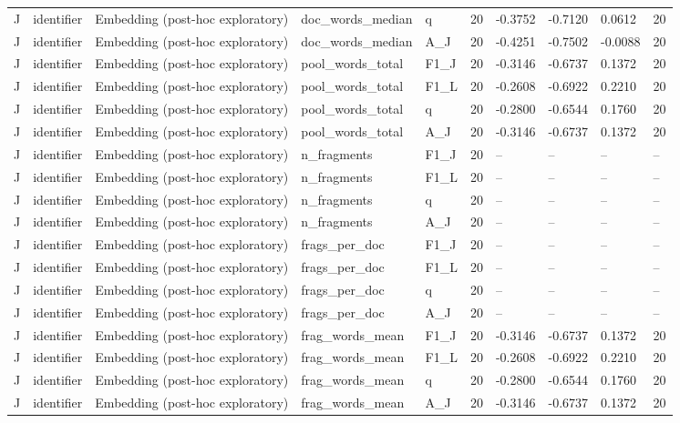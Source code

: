\begin{table}[t]
{\begin{tabular}{llllllllll}
J & identifier & Embedding (post-hoc exploratory) & doc\_words\_median & q & 20 & -0.3752 & -0.7120 & 0.0612 & 20 \\
J & identifier & Embedding (post-hoc exploratory) & doc\_words\_median & A\_J & 20 & -0.4251 & -0.7502 & -0.0088 & 20 \\
J & identifier & Embedding (post-hoc exploratory) & pool\_words\_total & F1\_J & 20 & -0.3146 & -0.6737 & 0.1372 & 20 \\
J & identifier & Embedding (post-hoc exploratory) & pool\_words\_total & F1\_L & 20 & -0.2608 & -0.6922 & 0.2210 & 20 \\
J & identifier & Embedding (post-hoc exploratory) & pool\_words\_total & q & 20 & -0.2800 & -0.6544 & 0.1760 & 20 \\
J & identifier & Embedding (post-hoc exploratory) & pool\_words\_total & A\_J & 20 & -0.3146 & -0.6737 & 0.1372 & 20 \\
J & identifier & Embedding (post-hoc exploratory) & n\_fragments & F1\_J & 20 & -- & -- & -- & -- \\
J & identifier & Embedding (post-hoc exploratory) & n\_fragments & F1\_L & 20 & -- & -- & -- & -- \\
J & identifier & Embedding (post-hoc exploratory) & n\_fragments & q & 20 & -- & -- & -- & -- \\
J & identifier & Embedding (post-hoc exploratory) & n\_fragments & A\_J & 20 & -- & -- & -- & -- \\
J & identifier & Embedding (post-hoc exploratory) & frags\_per\_doc & F1\_J & 20 & -- & -- & -- & -- \\
J & identifier & Embedding (post-hoc exploratory) & frags\_per\_doc & F1\_L & 20 & -- & -- & -- & -- \\
J & identifier & Embedding (post-hoc exploratory) & frags\_per\_doc & q & 20 & -- & -- & -- & -- \\
J & identifier & Embedding (post-hoc exploratory) & frags\_per\_doc & A\_J & 20 & -- & -- & -- & -- \\
J & identifier & Embedding (post-hoc exploratory) & frag\_words\_mean & F1\_J & 20 & -0.3146 & -0.6737 & 0.1372 & 20 \\
J & identifier & Embedding (post-hoc exploratory) & frag\_words\_mean & F1\_L & 20 & -0.2608 & -0.6922 & 0.2210 & 20 \\
J & identifier & Embedding (post-hoc exploratory) & frag\_words\_mean & q & 20 & -0.2800 & -0.6544 & 0.1760 & 20 \\
J & identifier & Embedding (post-hoc exploratory) & frag\_words\_mean & A\_J & 20 & -0.3146 & -0.6737 & 0.1372 & 20 \\

\end{tabular}}
\end{table}
